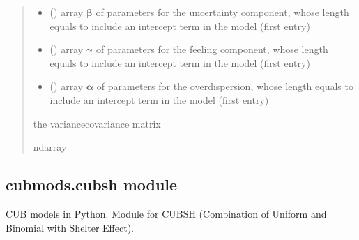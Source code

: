 \documentclass[letterpaper,10pt,english]{sphinxmanual}
\begin{document}
\begin{fulllineitems}
\begin{quote}
\begin{description}
\begin{itemize}
\item {} 
\sphinxAtStartPar
{} () \textendash{} array \(\pmb \beta\) of parameters for the uncertainty component, whose length equals 
 to include an intercept term in the model (first entry)

\item {} 
\sphinxAtStartPar
{} () \textendash{} array \(\pmb \gamma\) of parameters for the feeling component, whose length equals 
 to include an intercept term in the model (first entry)

\item {} 
\sphinxAtStartPar
{} () \textendash{} array \(\pmb \alpha\) of parameters for the overdispersion, whose length equals 
 to include an intercept term in the model (first entry)

\end{itemize}

\sphinxAtStartPar
the variance\sphinxhyphen{}covariance matrix

\sphinxAtStartPar
ndarray

\end{description}\end{quote}

\end{fulllineitems}



\subsection{cubmods.cubsh module}
\label{\detokenize{cubmods:module-cubmods.cubsh}}\label{\detokenize{cubmods:cubmods-cubsh-module}}\label{\detokenize{cubmods:cubsh000-module}}
\sphinxAtStartPar
CUB models in Python.
Module for CUBSH (Combination of Uniform
and Binomial with Shelter Effect).
\end{document}
